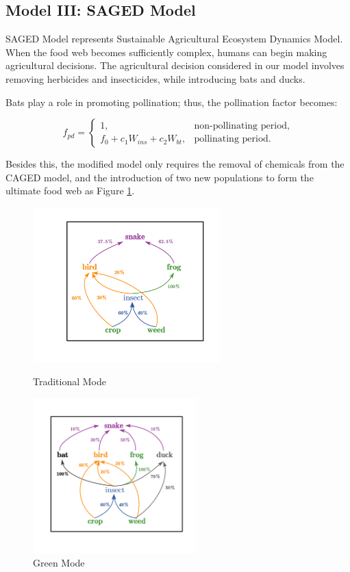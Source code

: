 \documentclass{HZNUMCM}
\begin{document}
    \subsection{Model III: SAGED Model}
      SAGED Model represents Sustainable Agricultural Ecosystem Dynamics Model.
      When the food web becomes sufficiently complex, 
      humans can begin making agricultural decisions. 
      The agricultural decision considered in our model involves removing herbicides and insecticides, 
      while introducing bats and ducks.

      Bats play a role in promoting pollination; thus, the pollination factor becomes:
      
      \[
      f_{pd} = \begin{cases}
      1, & \text{non-pollinating period}, \\
      f_0 + c_1 W_{ins} + c_2 W_{bt}, & \text{pollinating period}.
      \end{cases}
      \]
      
      Besides this, the modified model only requires the removal of chemicals from the CAGED model, 
      and the introduction of two new populations to form the ultimate food web as Figure \ref{fig:food_web_green}.
      \begin{figure}[H]
        \begin{minipage}[b]{0.45\linewidth}
          \centering
          \includegraphics[height=6cm, keepaspectratio]{images/food_web_chem.pdf}
          \caption{Traditional Mode}
          \label{fig:food_web_chem}
        \end{minipage}
        \hspace{0.05\linewidth}
        \begin{minipage}[b]{0.45\linewidth}
            \centering
            \includegraphics[height=6cm, keepaspectratio]{images/food_web.pdf} %
            \caption{Green Mode}
            \label{fig:food_web_green}
        \end{minipage}
      \end{figure}
\end{document}
